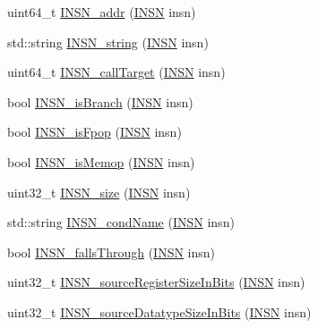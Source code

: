 \begin{DoxyCompactItemize}
$$uint64\-\_\-t \hyperlink{namespace_e_p_a_x_a07290c51b68be1f32d0411e5c0f612dc}{\-I\-N\-S\-N\-\_\-addr} (\hyperlink{namespace_e_p_a_x_a601da5f2ead9a877d566da6cfc9026eb}{\-I\-N\-S\-N} insn)
\item 
std\-::string \hyperlink{namespace_e_p_a_x_a6606e3913aeb19f5d863723e6ae63e7f}{\-I\-N\-S\-N\-\_\-string} (\hyperlink{namespace_e_p_a_x_a601da5f2ead9a877d566da6cfc9026eb}{\-I\-N\-S\-N} insn)
\item 
uint64\-\_\-t \hyperlink{namespace_e_p_a_x_a9fb272028d299f7ce5c49e9e2f6d362b}{\-I\-N\-S\-N\-\_\-call\-Target} (\hyperlink{namespace_e_p_a_x_a601da5f2ead9a877d566da6cfc9026eb}{\-I\-N\-S\-N} insn)
\item 
bool \hyperlink{namespace_e_p_a_x_a52a202189d478fbc50c54ed887ef001f}{\-I\-N\-S\-N\-\_\-is\-Branch} (\hyperlink{namespace_e_p_a_x_a601da5f2ead9a877d566da6cfc9026eb}{\-I\-N\-S\-N} insn)
\item 
bool \hyperlink{namespace_e_p_a_x_a995404839753a8da4b2fe7d27d9b32d2}{\-I\-N\-S\-N\-\_\-is\-Fpop} (\hyperlink{namespace_e_p_a_x_a601da5f2ead9a877d566da6cfc9026eb}{\-I\-N\-S\-N} insn)
\item 
bool \hyperlink{namespace_e_p_a_x_ad79c932f05a0e9b3a54d6625072ab087}{\-I\-N\-S\-N\-\_\-is\-Memop} (\hyperlink{namespace_e_p_a_x_a601da5f2ead9a877d566da6cfc9026eb}{\-I\-N\-S\-N} insn)
\item 
uint32\-\_\-t \hyperlink{namespace_e_p_a_x_ac633c15baaafa3d0fc43e61a7701dc77}{\-I\-N\-S\-N\-\_\-size} (\hyperlink{namespace_e_p_a_x_a601da5f2ead9a877d566da6cfc9026eb}{\-I\-N\-S\-N} insn)
\item 
std\-::string \hyperlink{namespace_e_p_a_x_aea916ea62f9be2c075a9fdc65675d68e}{\-I\-N\-S\-N\-\_\-cond\-Name} (\hyperlink{namespace_e_p_a_x_a601da5f2ead9a877d566da6cfc9026eb}{\-I\-N\-S\-N} insn)
\item 
bool \hyperlink{namespace_e_p_a_x_a753a61ab7cbf2d2cf3894f87b05575d2}{\-I\-N\-S\-N\-\_\-falls\-Through} (\hyperlink{namespace_e_p_a_x_a601da5f2ead9a877d566da6cfc9026eb}{\-I\-N\-S\-N} insn)
\item 
uint32\-\_\-t \hyperlink{namespace_e_p_a_x_a14b8ff0be25a61fa32905f2114ab278e}{\-I\-N\-S\-N\-\_\-source\-Register\-Size\-In\-Bits} (\hyperlink{namespace_e_p_a_x_a601da5f2ead9a877d566da6cfc9026eb}{\-I\-N\-S\-N} insn)
\item 
uint32\-\_\-t \hyperlink{namespace_e_p_a_x_a0a072c84ca3855c0bd6abf775ccbe448}{\-I\-N\-S\-N\-\_\-source\-Datatype\-Size\-In\-Bits} (\hyperlink{namespace_e_p_a_x_a601da5f2ead9a877d566da6cfc9026eb}{\-I\-N\-S\-N} insn)
\end{DoxyCompactItemize}


